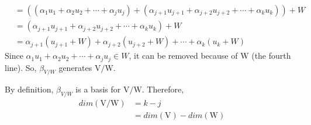 \documentclass[11pt]{scrartcl}
\begin{document}
\begin{enumerate}[label=\alph*.]
\begin{enumerate}[label=\roman*.]
{\begin{align*}
				              & =  ((\alpha_1u_1 + \alpha_2u_2 + \cdots + \alpha_ju_j) + (\alpha_{j+1}u_{j+1} + \alpha_{j+2}u_{j+2} + \cdots + \alpha_{k}u_{k})) + W \\
				              & = (\alpha_{j+1}u_{j+1} + \alpha_{j+2}u_{j+2} + \cdots + \alpha_{k}u_{k}) + W                                                         \\
				              & = \alpha_{j+1}(u_{j+1} + W) + \alpha_{j+2}(u_{j+2} + W) + \cdots + \alpha_{k}(u_{k} + W)
			            \end{align*}
			            }
			            Since $\alpha_1u_1 + \alpha_2u_2 + \cdots + \alpha_ju_j \in W$, it can be removed
			            because of $\mathrm{W}$ (the fourth line). So, $\beta_{V/W}$ generates $\mathrm{V}/\mathrm{W}$.
		      \end{enumerate}
		      By definition, $\beta_{V/W}$ is a basis for $\mathrm{V}/\mathrm{W}$.
		      Therefore,
		      \begin{align*}
			      dim(\mathrm{V}/\mathrm{W}) & =  k - j                            \\
			                                 & = dim(\mathrm{V}) - dim(\mathrm{W})
		      \end{align*}
	      \fi




\end{enumerate}
\end{document}
